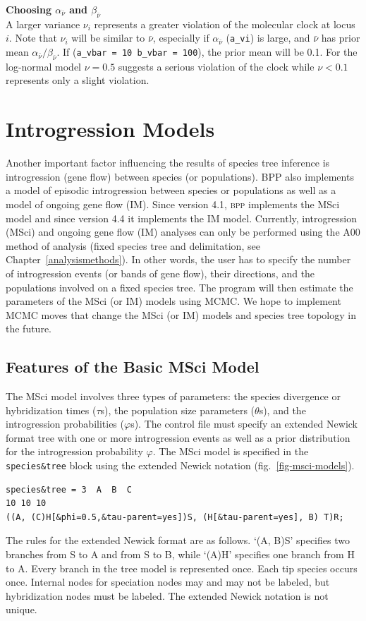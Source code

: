 \documentclass[a4paper]{book}
\numberwithin{equation}{section} \renewcommand{\baselinestretch}{0.55}
\begin{document}
\begin{mdframed}
  \textbf{Choosing $\alpha_{\bar{\nu}}$ and $\beta_{\bar{\nu}}$}\\
  A larger variance $\nu_i$ represents a greater violation of the
  molecular clock at locus $i$.  Note that $\nu_i$ will be similar to
  $\bar\nu$, especially if $\alpha_{\bar{\nu}}$ (\texttt{a\_vi}) is
  large, and $\bar\nu$ has prior mean
  $\alpha_{\bar{\nu}}/\beta_{\bar{\nu}}$.  If (\texttt{a\_vbar = 10
    b\_vbar = 100}), the prior mean will be 0.1.  For the log-normal
  model $\nu = 0.5$ suggests a serious violation of the clock while
  $\nu < 0.1$ represents only a slight violation.
\end{mdframed}

\chapter{Introgression Models}\label{introgression}
Another important factor influencing the results of species tree
inference is introgression (gene flow) between species (or
populations). BPP also implements a model of episodic introgression
between species or populations \cite{Flouri2020a} as well as a model of
ongoing gene flow (IM).  Since version 4.1,
\textsc{bpp} implements the MSci model \cite{Flouri2020a} and since version
4.4 it implements the IM model.  Currently, introgression (MSci) and
ongoing gene flow (IM) analyses can only be performed using the A00 method of
analysis (fixed species tree and delimitation, see
Chapter~\ref{analysismethods}).  In other words, the user has to
specify the number of introgression events (or bands of gene flow),
their directions, and the populations involved on a fixed species tree. The
program will then estimate the parameters of the MSci (or IM) models using MCMC.
We hope to implement MCMC moves that change the MSci (or IM) models and
species tree topology in the future.

\section{Features of the Basic MSci Model}
The MSci model involves three types of parameters: the species
divergence or hybridization times ($\tau$s), the population size
parameters ($\theta$s), and the introgression probabilities
($\varphi$s). The control file must specify an extended Newick format
tree with one or more introgression events as well as a prior
distribution for the introgression probability $\varphi$. The MSci
model is specified in the \texttt{species\&tree} block using the
extended Newick notation \citep{Cardona2008}
(fig.~\ref{fig-msci-models}).
\begin{verbatim}
species&tree = 3  A  B  C
10 10 10
((A, (C)H[&phi=0.5,&tau-parent=yes])S, (H[&tau-parent=yes], B) T)R;
\end{verbatim}
The rules for the extended Newick format are as follows.  `(A, B)S'
specifies two branches from S to A and from S to B, while ‘(A)H’
specifies one branch from H to A.  Every branch in the tree model is
represented once.  Each tip species occurs once.  Internal nodes for
speciation nodes may and may not be labeled, but hybridization nodes
must be labeled.  The extended Newick notation is not unique.
\end{document}
